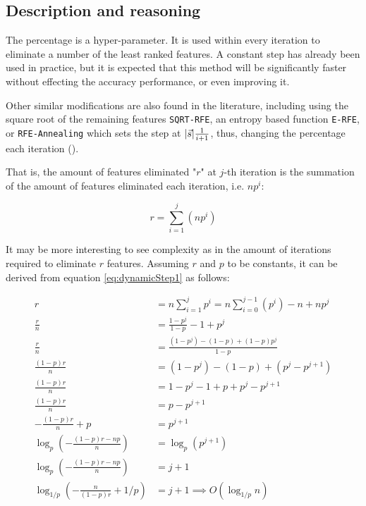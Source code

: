 \subsection{Description and reasoning}
\label{sec:dynamicStep.desc}

The percentage is a hyper-parameter. It is used within every iteration to eliminate a number of the least ranked features. A constant step has already been used in pract\-ice, but it is expected that this method will be significantly faster without effecting the accuracy performance, or even improving it.

Other similar modifications are also found in the literature, including using the square root of the remaining features \texttt{SQRT-RFE}, an entropy based function \texttt{E-RFE}, or \texttt{RFE-Annealing} which sets the step at $|\vec{s}| \frac{1}{i+1}$, thus, changing the percentage each iteration (\cite{ding_improving_2006}).

That is, the amount of features eliminated "$r$" at $j$-th iteration is the summation of the amount of features eliminated each iteration, i.e. $np^i$:

\begin{equation}\label{eq:dynamicStep1}
    r = \sum_{i = 1}^{j}{(np^i)} 
\end{equation}

It may be more interesting to see complexity as in the amount of iterations re\-quired to eliminate $r$ features. Assuming $r$ and $p$ to be constants, it can be derived from equation \ref{eq:dynamicStep1} as follows:

\begin{align*}
    r &= n \sum_{i = 1}^{j}{p^i} = n \sum_{i = 0}^{j-1}{(p^i)} - n + np^j \\
    \frac{r}{n} &= \frac{1-p^j}{1-p} - 1 + p^j \\
    \frac{r}{n} &= \frac{(1-p^j) - (1-p) + (1-p)p^j}{1-p}\\
    \frac{(1-p)r}{n} &= (1-p^j) - (1-p) + (p^j-p^{j+1})\\
    \frac{(1-p)r}{n} &= 1 -p^j -1 + p + p^j - p^{j+1}\\
    \frac{(1-p)r}{n} &= p - p^{j+1}\\
    - \frac{(1-p)r}{n} + p &= p^{j+1}\\
    \log_{p} \left( - \frac{(1-p)r - np}{n} \right) &= \log_{p} (p^{j+1})\\
    \log_{p} \left( - \frac{(1-p)r - np}{n} \right) &= j + 1\\
    \log_{1/p} \left( - \frac{n}{(1-p)r} + 1/p \right) &= j + 1 \implies O(\log_{1/p} n)
\end{align*}\\

